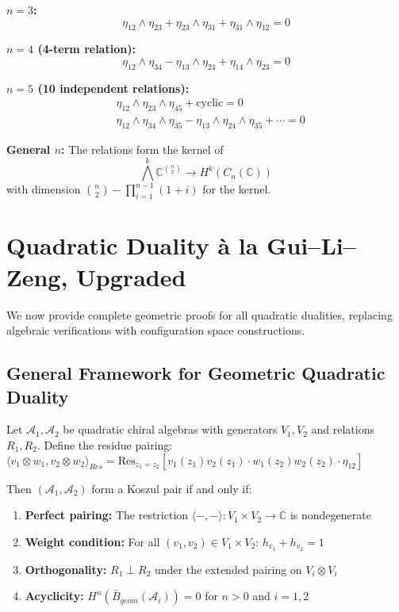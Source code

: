 \textbf{$n = 3$:}
\[
\eta_{12} \wedge \eta_{23} + \eta_{23} \wedge \eta_{31} + \eta_{31} \wedge \eta_{12} = 0
\]
 
\textbf{$n = 4$ (4-term relation):}
\[
\eta_{12} \wedge \eta_{34} - \eta_{13} \wedge \eta_{24} + \eta_{14} \wedge \eta_{23} = 0
\]
 
\textbf{$n = 5$ (10 independent relations):}
\begin{align}
&\eta_{12} \wedge \eta_{23} \wedge \eta_{45} + \text{cyclic} = 0 \\
&\eta_{12} \wedge \eta_{34} \wedge \eta_{35} - \eta_{13} \wedge \eta_{24} \wedge \eta_{35} + \cdots = 0
\end{align}
 
\textbf{General $n$:} The relations form the kernel of
\[
\bigwedge^k \mathbb{C}^{\binom{n}{2}} \to H^k(C_n(\mathbb{C}))
\]
with dimension $\binom{n}{2} - \prod_{i=1}^{n-1}(1 + i)$ for the kernel. 

\section{Quadratic Duality \`{a} la Gui--Li--Zeng, Upgraded}
 
We now provide complete geometric proofs for all quadratic dualities, replacing algebraic verifications with configuration space constructions.
 
\subsection{General Framework for Geometric Quadratic Duality}

\begin{theorem}
Let $\mathcal{A}_1, \mathcal{A}_2$ be quadratic chiral algebras with generators $V_1, V_2$ and relations $R_1, R_2$.
Define the residue pairing:
$\langle v_1 \otimes w_1, v_2 \otimes w_2\rangle_{Res} = \text{Res}_{z_1=z_2}[v_1(z_1)v_2(z_1) \cdot w_1(z_2)w_2(z_2) \cdot \eta_{12}]$

Then $(\mathcal{A}_1, \mathcal{A}_2)$ form a Koszul pair if and only if:
\begin{enumerate}
\item \textbf{Perfect pairing:} The restriction $\langle-,-\rangle: V_1 \times V_2 \to \mathbb{C}$ is nondegenerate
\item \textbf{Weight condition:} For all $(v_1, v_2) \in V_1 \times V_2$: $h_{v_1} + h_{v_2} = 1$
\item \textbf{Orthogonality:} $R_1 \perp R_2$ under the extended pairing on $V_i \otimes V_i$
\item \textbf{Acyclicity:} $H^n(\bar{B}_{geom}(\mathcal{A}_i)) = 0$ for $n > 0$ and $i = 1,2$
\end{enumerate}
\end{theorem}

